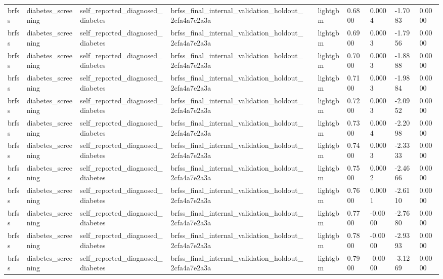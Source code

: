 \begin{tabular}{llllllllll}
brfss & diabetes\_screening & self\_reported\_diagnosed\_diabetes & brfss\_final\_internal\_validation\_holdout\_2cfa4a7e2a3a &  & lightgbm & 0.6800 & 0.0004 & -1.7083 & 0.0000 \\
brfss & diabetes\_screening & self\_reported\_diagnosed\_diabetes & brfss\_final\_internal\_validation\_holdout\_2cfa4a7e2a3a &  & lightgbm & 0.6900 & 0.0003 & -1.7956 & 0.0000 \\
brfss & diabetes\_screening & self\_reported\_diagnosed\_diabetes & brfss\_final\_internal\_validation\_holdout\_2cfa4a7e2a3a &  & lightgbm & 0.7000 & 0.0003 & -1.8888 & 0.0000 \\
brfss & diabetes\_screening & self\_reported\_diagnosed\_diabetes & brfss\_final\_internal\_validation\_holdout\_2cfa4a7e2a3a &  & lightgbm & 0.7100 & 0.0003 & -1.9884 & 0.0000 \\
brfss & diabetes\_screening & self\_reported\_diagnosed\_diabetes & brfss\_final\_internal\_validation\_holdout\_2cfa4a7e2a3a &  & lightgbm & 0.7200 & 0.0003 & -2.0952 & 0.0000 \\
brfss & diabetes\_screening & self\_reported\_diagnosed\_diabetes & brfss\_final\_internal\_validation\_holdout\_2cfa4a7e2a3a &  & lightgbm & 0.7300 & 0.0004 & -2.2098 & 0.0000 \\
brfss & diabetes\_screening & self\_reported\_diagnosed\_diabetes & brfss\_final\_internal\_validation\_holdout\_2cfa4a7e2a3a &  & lightgbm & 0.7400 & 0.0003 & -2.3333 & 0.0000 \\
brfss & diabetes\_screening & self\_reported\_diagnosed\_diabetes & brfss\_final\_internal\_validation\_holdout\_2cfa4a7e2a3a &  & lightgbm & 0.7500 & 0.0002 & -2.4666 & 0.0000 \\
brfss & diabetes\_screening & self\_reported\_diagnosed\_diabetes & brfss\_final\_internal\_validation\_holdout\_2cfa4a7e2a3a &  & lightgbm & 0.7600 & 0.0001 & -2.6110 & 0.0000 \\
brfss & diabetes\_screening & self\_reported\_diagnosed\_diabetes & brfss\_final\_internal\_validation\_holdout\_2cfa4a7e2a3a &  & lightgbm & 0.7700 & -0.0000 & -2.7680 & 0.0000 \\
brfss & diabetes\_screening & self\_reported\_diagnosed\_diabetes & brfss\_final\_internal\_validation\_holdout\_2cfa4a7e2a3a &  & lightgbm & 0.7800 & -0.0000 & -2.9393 & 0.0000 \\
brfss & diabetes\_screening & self\_reported\_diagnosed\_diabetes & brfss\_final\_internal\_validation\_holdout\_2cfa4a7e2a3a &  & lightgbm & 0.7900 & -0.0000 & -3.1269 & 0.0000 \\

\end{tabular}
